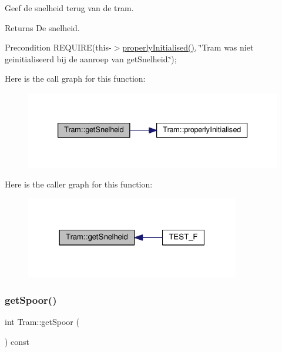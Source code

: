 Geef de snelheid terug van de tram. 

\begin{DoxyReturn}{Returns}
De snelheid. 
\end{DoxyReturn}
\begin{DoxyPrecond}{Precondition}
R\+E\+Q\+U\+I\+RE(this-\/$>$\hyperlink{class_tram_ac2688f590e4db232b4f535c9bf959efb}{properly\+Initialised()}, \char`\"{}\+Tram was niet geinitialiseerd bij de aanroep van get\+Snelheid.\char`\"{}); 
\end{DoxyPrecond}
Here is the call graph for this function\+:\nopagebreak
\begin{figure}[H]
\begin{center}
\leavevmode
\includegraphics[width=333pt]{class_tram_aa8bcd980469801cb8524f170006f666c_cgraph}
\end{center}
\end{figure}
Here is the caller graph for this function\+:\nopagebreak
\begin{figure}[H]
\begin{center}
\leavevmode
\includegraphics[width=265pt]{class_tram_aa8bcd980469801cb8524f170006f666c_icgraph}
\end{center}
\end{figure}
\mbox{\label{class_tram_a46c37aab218c334dac8b5340647f53ab}} 
\subsubsection{\texorpdfstring{get\+Spoor()}{getSpoor()}}
{\footnotesize\ttfamily int Tram\+::get\+Spoor (\begin{DoxyParamCaption}{ }\end{DoxyParamCaption}) const}



